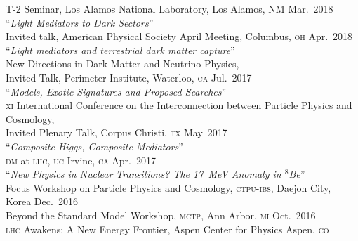 \documentclass[margin,line]{resume}
\newcommand{\mytalksep}{-.1mm}
\newcommand{\mytalkskip}{2mm}
\newcommand{\scap}[1]{\textsc{\MakeLowercase{#1}}}
\begin{document}
\begin{resume}
%
T-2 Seminar, Los Alamos National Laboratory, Los Alamos, \textsc{NM}
\hfill %
Mar.~2018\vspace{\mytalkskip}\\   
%
%
%
``\emph{Light Mediators to Dark Sectors}'' 
\vspace{\mytalksep}\\ 
Invited talk, American Physical Society April Meeting, Columbus, \scap{OH}
\hfill %
Apr.~2018\vspace{\mytalkskip}\\   
%
%
%
``\emph{Light mediators and terrestrial dark matter capture}'' 
\vspace{\mytalksep}\\ 
New Directions in Dark Matter and Neutrino Physics,\\
	Invited Talk, Perimeter Institute, Waterloo, \scap{CA}
\hfill %
Jul.~2017\vspace{\mytalkskip}\\   
%
%
%
``\emph{Models, Exotic Signatures and Proposed Searches}'' 
\vspace{\mytalksep}\\ 
\scap{XI} International Conference on the Interconnection between Particle Physics and Cosmology,\\
	Invited Plenary Talk, Corpus Christi, \scap{TX}
\hfill %
May~2017\vspace{\mytalkskip}\\   
%
%
%
``\emph{Composite Higgs, Composite Mediators}''
\vspace{\mytalksep}\\ 
\scap{DM} at \scap{LHC}, \scap{UC} Irvine, \scap{CA}
\hfill %
Apr.~2017\vspace{\mytalkskip}\\   
%
%
%
``\emph{New Physics in Nuclear Transitions? The 17~MeV Anomaly in $^8$Be}''
\vspace{\mytalksep}\\ 
%
Focus Workshop on Particle Physics and Cosmology,
\scap{CTPU-IBS},
Daejon City, Korea
\hfill %
Dec.~2016\vspace{\mytalksep}\\ 
%
Beyond the Standard Model Workshop,
\scap{MCTP},
Ann Arbor, \scap{MI}
\hfill %
Oct.~2016\vspace{\mytalksep}\\ 
%
\scap{LHC} Awakens: A New Energy Frontier,
Aspen Center for Physics
Aspen, \scap{CO}

\end{resume}
\end{document}
